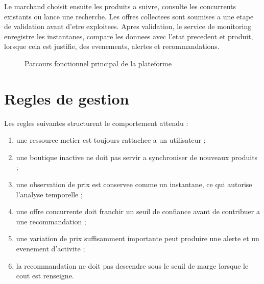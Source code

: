 \documentclass[12pt,a4paper,oneside]{report}
\begin{document}
Le marchand choisit ensuite les produits a suivre, consulte les concurrents existants ou lance une recherche. Les offres collectees sont soumises a une etape de validation avant d'etre exploitees. Apres validation, le service de monitoring enregistre les instantanes, compare les donnees avec l'etat precedent et produit, lorsque cela est justifie, des evenements, alertes et recommandations.

\begin{figure}[H]
\centering
{}
\caption{Parcours fonctionnel principal de la plateforme}
\label{fig:functional-flow}
\end{figure}

\section{Regles de gestion}
Les regles suivantes structurent le comportement attendu :
\begin{enumerate}
  \item une ressource metier est toujours rattachee a un utilisateur ;
  \item une boutique inactive ne doit pas servir a synchroniser de nouveaux produits ;
  \item une observation de prix est conservee comme un instantane, ce qui autorise l'analyse temporelle ;
  \item une offre concurrente doit franchir un seuil de confiance avant de contribuer a une recommandation ;
  \item une variation de prix suffisamment importante peut produire une alerte et un evenement d'activite ;
  \item la recommandation ne doit pas descendre sous le seuil de marge lorsque le cout est renseigne.
\end{enumerate}
\end{document}
